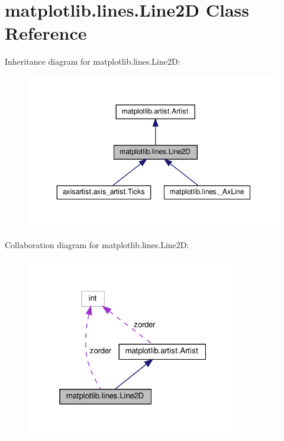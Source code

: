 \hypertarget{classmatplotlib_1_1lines_1_1Line2D}{}\section{matplotlib.\+lines.\+Line2D Class Reference}
\label{classmatplotlib_1_1lines_1_1Line2D}


Inheritance diagram for matplotlib.\+lines.\+Line2D\+:
\nopagebreak
\begin{figure}[H]
\begin{center}
\leavevmode
\includegraphics[width=350pt]{classmatplotlib_1_1lines_1_1Line2D__inherit__graph}
\end{center}
\end{figure}


Collaboration diagram for matplotlib.\+lines.\+Line2D\+:
\nopagebreak
\begin{figure}[H]
\begin{center}
\leavevmode
\includegraphics[width=265pt]{classmatplotlib_1_1lines_1_1Line2D__coll__graph}
\end{center}
\end{figure}
